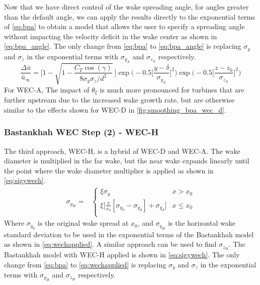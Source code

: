 \documentclass{jpconf}
\begin{document}
Now that we have direct control of the wake spreading angle, for angles greater than the default angle, we can apply the results directly to the exponential terms of \cref{eq:bpa} to obtain a model that allows the user to specify a spreading angle without impacting the velocity deficit in the wake center as shown in \cref{eq:bpa_angle}. The only change from \cref{eq:bpa} to \cref{eq:bpa_angle} is replacing $\sigma_y$ and $\sigma_z$ in the exponential terms with $\sigma_{y_{\text{A}}}$ and $\sigma_{z_{\text{A}}}$ respectively.
\begin{equation}
	\frac{\Delta \bar{u}}{\bar{u}_{\infty}} = \Bigg[1-\sqrt{1-\frac{C_T \cos{(\gamma)}}{8 \sigma_y \sigma_z/d^2}}~\Bigg] \exp{\bigg(-0.5\Big[\frac{y-\delta}{\sigma_{y_{\text{A}}}}\Big]^2\bigg)}\exp{\bigg(-0.5\Big[\frac{z-z_h}{\sigma_{z_{\text{A}}}}\Big]^2\bigg)}
	\label{eq:bpa_angle}
\end{equation}
%
For WEC-A, The impact of $\theta_\xi$ is much more pronounced for turbines that are further upstream due to the increased wake growth rate, but are otherwise similar to the effects shown for WEC-D in \cref{fig:smoothing_bpa_wec_d}.

\subsubsection{Bastankhah WEC Step (2) - WEC-H}

The third approach, WEC-H, is a hybrid of WEC-D and WEC-A. The wake diameter is multiplied in the far wake, but the near wake expands linearly until the point where the wake diameter multiplier is applied as shown in \cref{eq:sigywech}.
%
\begin{align}\label{eq:sigywech}
	\sigma_{y_H} = &
	\begin{cases}
		\xi \sigma_y & x > x_0 \\
		\xi \big[\frac{x}{x_0}[\sigma_{y_0} - \sigma_{y_d}] + \sigma_{y_d} \big]& x \le x_0 \\
	\end{cases}
\end{align}
%
Where $\sigma_{y_0}$ is the original wake spread at $x_0$, and $\sigma_{y_H}$ is the horizontal wake standard deviation to be used in the exponential terms of the Bastankhah model as shown in \cref{eq:wechapplied}. A similar approach can be used to find $\sigma_{z_H}$. The Bastankhah model with WEC-H applied is shown in \cref{eq:sigywech}. The only change from \cref{eq:bpa} to \cref{eq:wechapplied} is replacing $\sigma_y$ and $\sigma_z$ in the exponential terms with $\sigma_{y_{H}}$ and $\sigma_{z_{H}}$ respectively.
\end{document}
